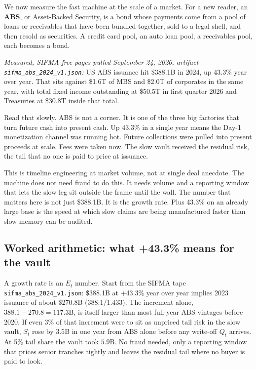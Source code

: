 We now measure the fast machine at the scale of a market. For a new reader, an \textbf{ABS}, or Asset-Backed Security, is a bond whose payments come from a pool of loans or receivables that have been bundled together, sold to a legal shell, and then resold as securities. A credit card pool, an auto loan pool, a receivables pool, each becomes a bond.

\textit{Measured, SIFMA free pages pulled September 24, 2026, artifact \texttt{sifma\_abs\_2024\_v1.json}:} US ABS issuance hit \$388.1B in 2024, up 43.3\% year over year. That sits against \$1.6T of MBS and \$2.0T of corporates in the same year, with total fixed income outstanding at \$50.5T in first quarter 2026 and Treasuries at \$30.8T inside that total.

Read that slowly. ABS is not a corner. It is one of the three big factories that turn future cash into present cash. Up 43.3\% in a single year means the Day-1 monetization channel was running hot. Future collections were pulled into present proceeds at scale. Fees were taken now. The slow vault received the residual risk, the tail that no one is paid to price at issuance.

This is timeline engineering at market volume, not at single deal anecdote. The machine does not need fraud to do this. It needs volume and a reporting window that lets the slow leg sit outside the frame until the wall. The number that matters here is not just \$388.1B. It is the growth rate. Plus 43.3\% on an already large base is the speed at which slow claims are being manufactured faster than slow memory can be audited.

\subsection*{Worked arithmetic: what +43.3\% means for the vault}

A growth rate is an $E_t$ number. Start from the SIFMA tape \texttt{sifma\_abs\_2024\_v1.json}: \$388.1B at +43.3\% year over year implies 2023 issuance of about \$270.8B ($388.1 / 1.433$). The increment alone, $388.1 - 270.8 = 117.3$B, is itself larger than most full-year ABS vintages before 2020. If even 3\% of that increment were to sit as unpriced tail risk in the slow vault, $S_t$ rose by $3.5$B in one year from ABS alone before any write-off $Q_t$ arrives. At 5\% tail share the vault took $5.9$B. No fraud needed, only a reporting window that prices senior tranches tightly and leaves the residual tail where no buyer is paid to look.

